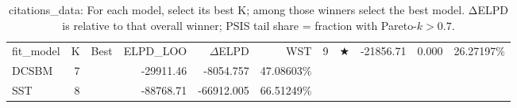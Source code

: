 \begin{table}[!h]
\centering
\caption{citations_data: For each model, select its best K; among those winners select the best model. ΔELPD is relative to that overall winner; PSIS tail share = fraction with Pareto-\(k>0.7\).\\\label{tab:app-citations_data-bestK-per-model}}
\centering
\begin{tabular}[t]{lrlrrr}
\toprule
fit_model & K & Best & ELPD\_LOO & $\Delta$ELPD & %
\midrule
WST & 9 & $\bigstar$ & -21856.71 & 0.000 & 26.27197\%\\
DCSBM & 7 &  & -29911.46 & -8054.757 & 47.08603\%\\
SST & 8 &  & -88768.71 & -66912.005 & 66.51249\%\\
\bottomrule
\end{tabular}
\end{table}
